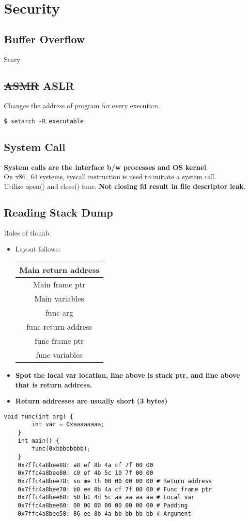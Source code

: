 \documentclass{article}
\begin{document}
\section{Security}

\subsection{Buffer Overflow}
Scary

\subsection{\st{ASMR} ASLR}
Changes the address of program for every execution.
\begin{lstlisting}[style=BashStyle]
    $ setarch -R executable
\end{lstlisting}

\subsection{System Call}
\textbf{System calls are the interface b/w processes and OS kernel}.\\
On x86\_64 systems, syscall instruction is used to initiate a system call.\\
Utilize open() and close() func. \textbf{Not closing fd result in file descriptor leak}.

\subsection{Reading Stack Dump}
Rules of thumb:
\begin{itemize}
    \item Layout follows:
    \begin{tabular}{c}
        Main return address\\
        \hline
        Main frame ptr\\
        \hline
        Main variables\\
        \hline
        func arg\\
        \hline
        func return address\\
        \hline
        func frame ptr\\
        \hline
        func variables
    \end{tabular}
    \item \textbf{Spot the local var location, line above is stack ptr, and line above that is return address.}
    \item \textbf{Return addresses are usually short (3 bytes)}
\end{itemize}
\begin{lstlisting}[style=BashStyle]
    void func(int arg) {
        int var = 0xaaaaaaaa;
    }
    int main() {
        func(0xbbbbbbbb);
    }
    0x7ffc4a8bee88: a8 ef 8b 4a cf 7f 00 00
    0x7ffc4a8bee80: c0 ef 4b 5c 10 7f 00 00
    0x7ffc4a8bee78: so me th 00 00 00 00 00 # Return address
    0x7ffc4a8bee70: b0 ee 8b 4a cf 7f 00 00 # Func frame ptr
    0x7ffc4a8bee68: 50 b1 4d 5c aa aa aa aa # Local var
    0x7ffc4a8bee60: 00 00 00 00 00 00 00 00 # Padding
    0x7ffc4a8bee58: 86 ee 8b 4a bb bb bb bb # Argument
\end{lstlisting}
\end{document}
